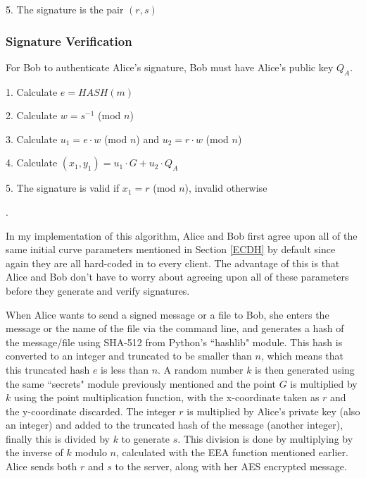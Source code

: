 \documentclass[12pt,a4paper]{article}
\begin{document}
5. \space The signature is the pair $(r,s)$

\subsubsection{Signature Verification} \noindent \label{Signature Verification}
For Bob to authenticate Alice's signature, Bob must have Alice's public key $Q_A$.

\vspace{1mm}

1. \space Calculate $e = HASH(m)$

2. \space Calculate $w = s^{-1}$ (mod $n$)

3. \space Calculate $u_1 = e \cdot w$ (mod $n$) and $u_2 = r \cdot w$ (mod $n$)

4. \space Calculate $(x_1,y_1) = u_1 \cdot G + u_2 \cdot Q_A$

5. \space The signature is valid if $x_1 = r$ (mod $n$), invalid otherwise

\vspace{2mm}

\cite{jurivsic1997elliptic,koblitz2000state,hankerson2003guide,anoop2007elliptic,silverman2009arithmetic,brown2009standards}.

\vspace{5mm}

In my implementation of this algorithm, Alice and Bob first agree upon all of the same initial curve parameters mentioned in Section \ref{ECDH} 
by default since again they are all hard-coded in to every client. 
The advantage of this is that Alice and Bob don't have to worry about agreeing upon all of these parameters before they generate and verify signatures. 

When Alice wants to send a signed message or a file to Bob, she enters the message or the name of the file via the command line, 
and generates a hash of the message/file using SHA-512 from Python's ``hashlib" module. 
This hash is converted to an integer and truncated to be smaller than $n$, which means that this truncated hash $e$ is less than $n$. 
A random number $k$ is then generated using the same ``secrets" module previously mentioned and the point $G$ is multiplied by $k$ using 
the point multiplication function, with the x-coordinate taken as $r$ and the y-coordinate discarded. 
The integer $r$ is multiplied by Alice's private key (also an integer) and added to the truncated hash of the message (another integer), 
finally this is divided by $k$ to generate $s$. 
This division is done by multiplying by the inverse of $k$ modulo $n$, calculated with the EEA function mentioned earlier. 
Alice sends both $r$ and $s$ to the server, along with her AES encrypted message. 
\end{document}
